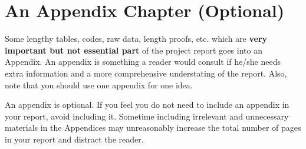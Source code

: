 \chapter{An Appendix Chapter (Optional)}
\label{appn:A}
Some lengthy tables, codes, raw data, length proofs, etc. which are \textbf{very important but not essential part} of the project report goes into an Appendix. An appendix is something a reader would consult if he/she needs extra information and a more comprehensive understating of the report. Also, note that you should use one appendix for one idea.

An appendix is optional. If you feel you do not need to include an appendix in your report, avoid including it. Sometime including irrelevant and unnecessary materials in the Appendices may unreasonably increase the total number of pages in your report and distract the reader.

